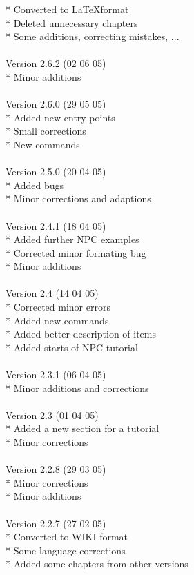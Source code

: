\documentclass[a4paper,10pt,makeidx]{scrreprt}
\begin{document}
* Converted to \LaTeX format\\
* Deleted unnecessary chapters\\
* Some additions, correcting mistakes, ...\\
\\
Version 2.6.2 (02 06 05)\\
* Minor additions\\
\\
Version 2.6.0 (29 05 05)\\
* Added new entry points\\
* Small corrections\\
* New commands\\
\\
Version 2.5.0 (20 04 05)\\
* Added bugs\\
* Minor corrections and adaptions\\
\\
Version 2.4.1 (18 04 05)\\
* Added further NPC examples\\
* Corrected minor formating bug\\
* Minor additions\\
\\
Version 2.4 (14 04 05)\\
* Corrected minor errors\\
* Added new commands\\
* Added better description of items\\
* Added starts of NPC tutorial\\
\\
Version 2.3.1 (06 04 05)\\
* Minor additions and corrections\\
\\
Version 2.3 (01 04 05)\\
* Added a new section for a tutorial\\
* Minor corrections\\
\\
Version 2.2.8 (29 03 05)\\
* Minor corrections\\
* Minor additions\\
\\
Version 2.2.7 (27 02 05)\\
* Converted to WIKI-format\\
* Some language corrections\\
* Added some chapters from other versions\\
\end{document}
